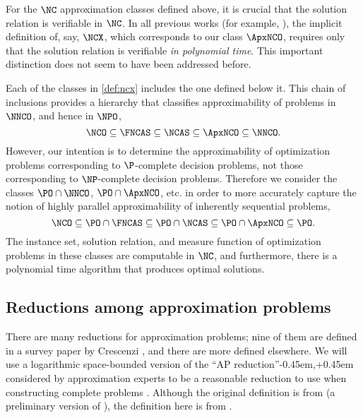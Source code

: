 For the $\NC$ approximation classes defined above, it is crucial that the solution relation is verifiable in $\NC$.
In all previous works (for example, \cite{dsst97, sx95}), the implicit definition of, say, $\NCX$, which corresponds to our class $\ApxNCO$, requires only that the solution relation is verifiable \emph{in polynomial time}.
This important distinction does not seem to have been addressed before.

Each of the classes in \autoref{def:ncx} includes the one defined below it.
This chain of inclusions provides a hierarchy that classifies approximability of problems in $\NNCO$, and hence in $\NPO$,
$$
\NCO \subseteq \FNCAS \subseteq \NCAS \subseteq \ApxNCO \subseteq \NNCO.
$$
However, our intention is to determine the approximability of optimization problems corresponding to $\P$-complete decision problems, not those corresponding to $\NP$-complete decision problems.
Therefore we consider the classes $\PO \cap \NNCO$, $\PO \cap \ApxNCO$, etc. in order to more accurately capture the notion of highly parallel approximability of inherently sequential problems,
$$
\NCO \subseteq \PO \cap \FNCAS \subseteq \PO \cap \NCAS \subseteq \PO \cap \ApxNCO \subseteq \PO.
$$
The instance set, solution relation, and measure function of optimization problems in these classes are computable in $\NC$, and furthermore, there is a polynomial time algorithm that produces optimal solutions.

\subsection{Reductions among approximation problems}

There are many reductions for approximation problems; nine of them are defined in a survey paper by Crescenzi \cite{crescenzi97}, and there are more defined elsewhere.
We will use a logarithmic space-bounded version of the ``AP reduction''\kern-0.45em,\kern+0.45em considered by approximation experts to be a reasonable reduction to use when constructing complete problems \cite[Section~2]{crescenzi97} \cite[Section~8.6]{acgkmp99}.
Although the original definition is from \cite[Definition~9]{ckst95} (a preliminary version of \cite[Definition~2.5]{ckst99}), the definition here is from \cite[Definition~8.3]{acgkmp99}.

